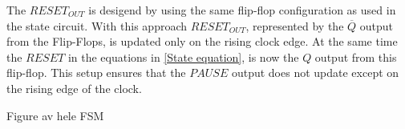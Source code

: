 The $RESET_{OUT}$ is desigend by using the same flip-flop configuration as used in the state circuit. With this approach $RESET_{OUT}$, represented by the $\overline{Q}$ output from the Flip-Flops, is updated only on the rising clock edge. At the same time the $RESET$ in the equations in \ref{State equation}, is now the $Q$ output from this flip-flop. This setup ensures that the $PAUSE$ output does not update except on the rising edge of the clock.


Figure av hele FSM
    


        
    
    

